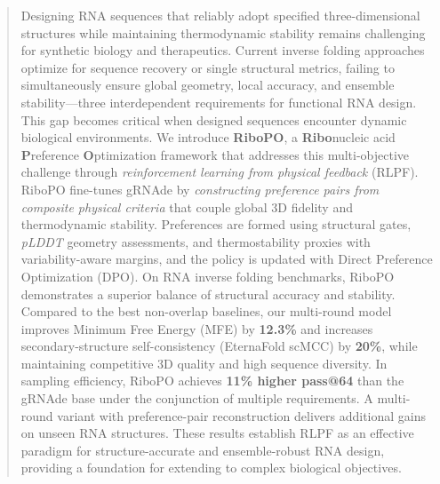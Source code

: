 

\begin{abstract}
Designing RNA sequences that reliably adopt specified three-dimensional structures while maintaining thermodynamic stability remains challenging for synthetic biology and therapeutics. Current inverse folding approaches optimize for sequence recovery or single structural metrics, failing to simultaneously ensure global geometry, local accuracy, and ensemble stability—three interdependent requirements for functional RNA design. This gap becomes critical when designed sequences encounter dynamic biological environments.
We introduce \textbf{RiboPO}, a \textbf{Ribo}nucleic acid \textbf{P}reference \textbf{O}ptimization framework that addresses this multi-objective challenge through \emph{reinforcement learning from physical feedback} (RLPF). RiboPO fine-tunes gRNAde by \emph{constructing preference pairs from composite physical criteria} that couple global 3D fidelity and thermodynamic stability. Preferences are formed using structural gates, \emph{pLDDT} geometry assessments, and thermostability proxies with variability-aware margins, and the policy is updated with Direct Preference Optimization (DPO). On RNA inverse folding benchmarks, RiboPO demonstrates a superior balance of structural accuracy and stability. Compared to the best non-overlap baselines, our multi-round model improves Minimum Free Energy (MFE) by \textbf{12.3\%} and increases secondary-structure self-consistency (EternaFold scMCC) by \textbf{20\%}, while maintaining competitive 3D quality and high sequence diversity. In sampling efficiency, RiboPO achieves \textbf{11\% higher pass@64} than the gRNAde base under the conjunction of multiple requirements. A multi-round variant with preference-pair reconstruction delivers additional gains on unseen RNA structures. These results establish RLPF as an effective paradigm for structure-accurate and ensemble-robust RNA design, providing a foundation for extending to complex biological objectives.
\end{abstract}
